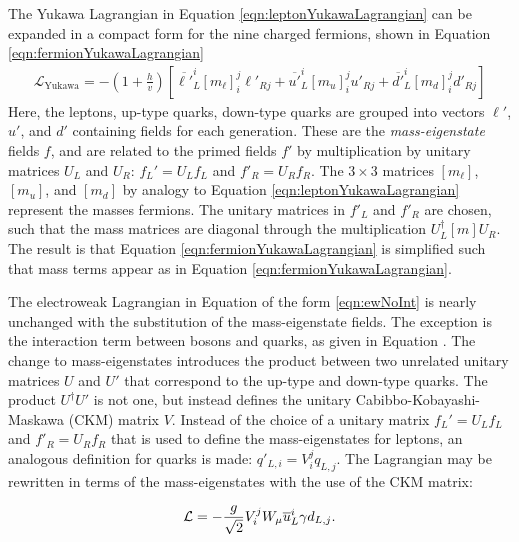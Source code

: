 The Yukawa Lagrangian in Equation \ref{eqn:leptonYukawaLagrangian} can be expanded in a compact form for the nine charged fermions, shown in Equation \ref{eqn:fermionYukawaLagrangian}
\begin{equation}\begin{split}\label{eqn:fermionYukawaLagrangian}
        \mathcal{L}_{\text{Yukawa}}=-\left(1+\frac{h}{v}\right)\left[ \overline{\ell'}_L^i[m_{\ell}]_i^j\ell'_{Rj} + \overline{u'}_L^i[m_{u}]_i^ju'_{Rj} + \overline{d'}_L^i[m_{d}]_i^jd'_{Rj} \right]
\end{split}\end{equation}
Here, the leptons, up-type quarks, down-type quarks are grouped into vectors $\ell'$, $u'$, and $d'$ containing fields for each generation.
These are the \emph{mass-eigenstate} fields $f$, and are related to the primed fields $f'$ by multiplication by unitary matrices $U_L$ and $U_R$: $f_L'=U_Lf_L$ and $f'_R=U_Rf_R$.
The $3\times3$ matrices $[m_{\ell}]$, $[m_{u}]$, and $[m_{d}]$ by analogy to Equation \ref{eqn:leptonYukawaLagrangian} represent the masses fermions.
The unitary matrices in $f'_L$ and $f'_R$ are chosen, such that the mass matrices are diagonal through the multiplication $U^\dagger_L[m]U_R$.
The result is that Equation \ref{eqn:fermionYukawaLagrangian} is simplified such that mass terms appear as in Equation \ref{eqn:fermionYukawaLagrangian}.

The electroweak Lagrangian in Equation of the form \ref{eqn:ewNoInt} is nearly unchanged with the substitution of the mass-eigenstate fields.
The exception is the interaction term between \W bosons and quarks, as given in Equation \label{eqn:ewLagrangianCc}.
The change to mass-eigenstates introduces the product between two unrelated unitary matrices $U$ and $U'$ that correspond to the up-type and down-type quarks.
The product $U^\dagger U'$ is not one, but instead defines the unitary Cabibbo-Kobayashi-Maskawa (CKM) matrix $V$.
Instead of the choice of a unitary matrix $f_L'=U_Lf_L$ and $f'_R=U_Rf_R$ that is used to define the mass-eigenstates for leptons, an analogous definition for quarks is made: $q'_{L,i}=V_i^jq_{L,j}$.
The Lagrangian may be rewritten in terms of the mass-eigenstates with the use of the CKM matrix:

\begin{equation}\begin{split}
    \mathcal{L}=-\frac{g}{\sqrt{2}}V_i^jW_\mu\overline{u}^i_L\gamma d_{L,j}.
\end{split}\end{equation}

